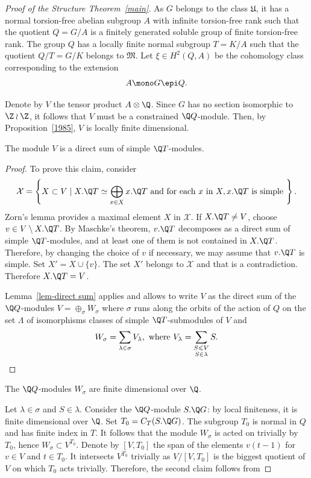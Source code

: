 \begin{proof}[{Proof of the Structure Theorem~\ref{main}}]
As $G$ belongs to the class $\mathfrak{U}$, it has a normal torsion-free abelian subgroup $A$ with infinite torsion-free rank such that the quotient $Q= G/A$ is a finitely generated soluble group of finite torsion-free rank. The group $Q$ has a locally finite normal subgroup $T = K/A$ such that the quotient $Q/T = G/K$ belongs to $\mathfrak{M}$. Let $\xi \in H^2(Q, A)$ be the cohomology class corresponding to the extension
\[
A \mono G \epi Q.
\]

Denote by $V$ the tensor product $A \otimes \Q$. Since $G$ has no section isomorphic to $\Z \wr \Z$, it follows that $V$ must be a constrained $\Q Q$-module. Then, by Proposition~\ref{1985}, $V$ is locally finite dimensional.
\begin{claiml}
The module $V$ is a direct sum of simple $\Q T$-modules.
\end{claiml}
\begin{proof}
To prove this claim, consider
\[
\mathcal{X} = \left\{ X \subset V \mid X.\Q T \simeq \bigoplus_{x\in X} x.\Q T \text{ and for each } x \text{ in } X, x.\Q T \text{ is simple } \right\}.
\]
Zorn's lemma provides a maximal element $X$ in $\mathcal{X}$. If $X.\Q T\neq V$, choose $v\in V\setminus X.\Q T$. By Maschke's theorem, $v.\Q T$ decomposes as a direct sum of simple $\Q T$-modules, and at least one of them is not contained in $X.\Q T$. Therefore, by changing the choice of $v$ if necessary, we may assume that $v.\Q T$ is simple. Set $X' = X \cup \{v\}$. The set $X'$ belongs to $\mathcal X$ and that is a contradiction. Therefore $X.\Q T = V$.

\medskip

Lemma~\ref{lem-direct sum} applies and allows to write $V$ as the direct sum of the $\Q Q$-modules $V = \oplus_\sigma W_\sigma$ where $\sigma$ runs along the orbits of the action of $Q$ on the set $\Lambda$ of isomorphisms classes of simple $\Q T$-submodules of $V$ and
\[
W_\sigma = \sum_{\lambda \in \sigma} V_\lambda, \text{ where } V_\lambda = \sum_{\substack{S \leqslant V \\ S\in \lambda}} S. \qedhere
\]
\end{proof}


\begin{claiml}
The $\Q Q$-modules $W_\sigma$ are finite dimensional over $\Q$.
\end{claiml}

Let $\lambda \in \sigma$ and $S\in \lambda$. Consider the $\Q Q$-module $S.\Q G$: by local finiteness, it is finite dimensional over $\Q$. Set $T_0 = C_T(S.\Q G)$. The subgroup $T_0$ is normal in $Q$ and has finite index in $T$. It follows that the module $W_\sigma$ is acted on trivially by $T_0$, hence $W_\sigma \subset V^{T_0}$. Denote by $[V, T_0]$ the span of the elements $v(t-1)$ for $v \in V$ and $t \in T_0$. It intersects $V^{T_0}$ trivially as $V/[V, T_0]$ is the biggest quotient of $V$ on which $T_0$ acts trivially. Therefore, the second claim follows from



\end{proof}
